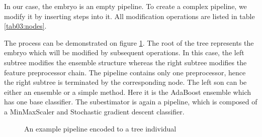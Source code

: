 In our case, the embryo is an empty pipeline. To create a complex pipeline, we
modify it by inserting steps into it. All modification operations are listed in
table \ref{tab03:nodes}.

The process can be demonstrated on figure
\ref{pic:pipeencoding}. The root of the tree represents the embryo which will
be modified by subsequent operations. In this case, the left subtree modifies
the ensemble structure whereas the right subtree modifies the feature
preprocessor chain. The pipeline contains only one preprocessor, hence the
right subtree is terminated by the corresponding node. The left son can be
either an ensemble or a simple method. Here it is the AdaBoost ensemble which
has one base classifier. The subestimator is again a pipeline, which is composed
of a MinMaxScaler and Stochastic gradient descent classifier.

\begin{figure}[ht]\centering
    \qquad
    \caption{An example pipeline encoded to a tree individual}%
    \label{pic:pipeencoding}%
\end{figure}

